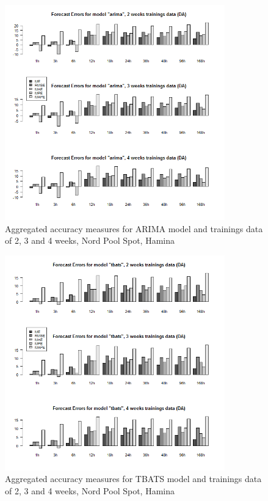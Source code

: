 \begin{figure}[!ht]
	\centering
		\includegraphics[width=0.85\textwidth]{figures/appendix_forecast_results/da_sim_1_x_1w_1w_arima.png}
	\caption{Aggregated accuracy measures for ARIMA model and trainings data of 2, 3 and 4 weeks, Nord
Pool Spot, Hamina}
	\label{fig:app_da_sim_1_x_1w_1w_arima}
	\vspace*{-1.6in}
\end{figure}




\begin{figure}[!ht]
	\centering
		\includegraphics[width=0.85\textwidth]{figures/appendix_forecast_results/da_sim_1_x_1w_1w_tbats.png}
	\caption{Aggregated accuracy measures for TBATS model and trainings data of 2, 3 and 4 weeks, Nord
Pool Spot, Hamina}
	\label{fig:app_da_sim_1_x_1w_1w_tbats}
\end{figure}



